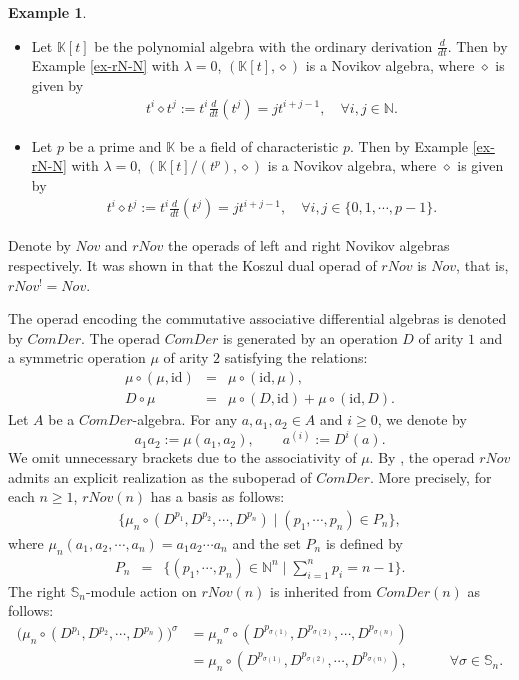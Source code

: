 \documentclass[12pt]{amsart}
\theoremstyle{definition}
\newtheorem{ex}[thm]{Example}
\newcommand{\id}{\mathrm{id}}
\newcommand{\dsN}{\mathds{N}}
\begin{document}
\begin{ex}\label{ex-kt-p}
\begin{itemize}
\item[{\rm (i)}] Let $\mathds{K}[t]$ be the polynomial algebra with the ordinary derivation $\frac{d}{dt}$. Then by Example \ref{ex-rN-N} with $\lambda =0$, $(\mathds{K}[t],\diamond)$ is a Novikov algebra, where $\diamond$ is given by
\begin{align*}
t^i\diamond t^j:=t^i\frac{d}{dt} (t^j)=jt^{i+j-1},\quad\forall i,j\in\mathds{N}.
\end{align*}
\item[{\rm (ii)}]  Let $p$ be a prime and $\mathds{K}$ be a field of characteristic $p$. Then by Example \ref{ex-rN-N} with $\lambda =0$, $(\mathds{K}[t]/(t^p),\diamond)$ is a Novikov algebra, where $\diamond$ is given by
\begin{align*}
	t^i\diamond t^j:=t^i\frac{d}{dt} (t^j)=jt^{i+j-1},\quad\forall i,j\in\{0,1,\cdots,p-1\}.
\end{align*}
\end{itemize}
\end{ex}

Denote by $Nov$ and $rNov$ the operads of left and right Novikov algebras respectively. It was shown in \cite{D} that the Koszul dual operad of $rNov$ is $Nov$, that is, $rNov^! = Nov$.

The operad encoding the commutative associative differential algebras is denoted by $ComDer$. The operad $ComDer$ is generated by an operation $D$ of arity $1$ and a symmetric operation $\mu$ of arity $2$ satisfying the relations:
\begin{eqnarray}
	\mu\circ(\mu,\id)&=& \mu\circ(\id,\mu),\\
	D\circ \mu&=&\mu\circ(D,\id)+\mu\circ(\id,D).
\end{eqnarray}
Let $A$ be a $ComDer$-algebra. For any \(a, a_1,a_2\in A\) and \(i\geq 0\), we denote by
$$
a_1a_2:=\mu(a_1,a_2), \qquad a^{(i)}:=D^i(a).
$$
We omit unnecessary brackets due to the associativity of $\mu$.  By \cite{DIU,DL}, the operad $rNov$ admits an explicit realization as the suboperad of $ComDer$. More precisely, for each $n\geq 1$, $rNov(n)$ has a basis as follows:
\begin{align}\label{eq:basis-rNov}
	\big\{\mu_n\circ (D^{p_1}, D^{p_2},\cdots,D^{p_n})\mid (p_1,\cdots,p_n)\in P_n\big\},
\end{align}
where $\mu_n(a_1,a_2,\cdots,a_n)=a_1a_2\cdots a_n$ and the set $P_n$ is defined by
\begin{eqnarray}\label{Pn}
P_n&=&\{(p_1,\cdots,p_n)\in\dsN^n\mid\sum\limits_{i=1}^n p_i=n-1\}.
\end{eqnarray}
The right $\mathbb{S}_n$-module action on $rNov(n)$ is inherited from $ComDer(n)$ as follows:
\begin{align}\label{action-on-rNov}
	\big(\mu_n\circ (D^{p_1}, D^{p_2},\cdots,D^{p_n})\big)^\sigma &={\mu_n}^\sigma\circ (D^{p_{\sigma(1)}}, D^{p_{\sigma(2)}},\cdots,D^{p_{\sigma(n)}})\\
	&=\mu_n\circ(D^{p_{\sigma(1)}}, D^{p_{\sigma(2)}},\cdots,D^{p_{\sigma(n)}}),\qquad\quad\forall\sigma\in\mathbb{S}_n.\nonumber
\end{align}
\end{document}

